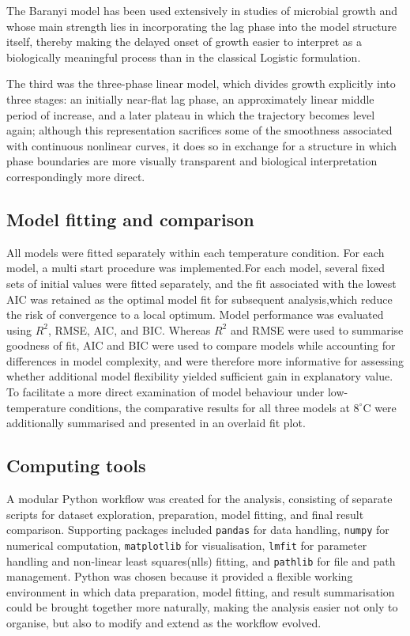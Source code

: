 \documentclass[11pt,onecolumn,draftclsnofoot]{IEEEtran}
\begin{document}
The Baranyi model has been used extensively in studies of microbial growth and whose main strength lies in incorporating the lag phase into the model structure itself, thereby making the delayed onset of growth easier to interpret as a biologically meaningful process than in the classical Logistic formulation\cite{BARANYI1994277}.

The third was the three-phase linear model, which divides growth explicitly into three stages: an initially near-flat lag phase, an approximately linear middle period of increase, and a later plateau in which the trajectory becomes level again; although this representation sacrifices some of the smoothness associated with continuous nonlinear curves, it does so in exchange for a structure in which phase boundaries are more visually transparent and biological interpretation correspondingly more direct\cite{BUCHANAN1997313}.

\subsection{Model fitting and comparison}
All models were fitted separately within each temperature condition. For each model, a multi start procedure was implemented.For each model, several fixed sets of initial values were fitted separately, and the fit associated with the lowest AIC was retained as the optimal model fit for subsequent analysis,which reduce the risk of convergence to a local optimum. Model performance was evaluated using $R^2$, RMSE, AIC, and BIC. Whereas $R^2$ and RMSE were used to summarise goodness of fit, AIC and BIC were used to compare models while accounting for differences in model complexity, and were therefore more informative for assessing whether additional model flexibility yielded sufficient gain in explanatory value. To facilitate a more direct examination of model behaviour under low-temperature conditions, the comparative results for all three models at $8^\circ$C were additionally summarised and presented in an overlaid fit plot.

\subsection{Computing tools}
A modular Python workflow was created for the analysis, consisting of separate scripts for dataset exploration,  preparation, model fitting, and final result comparison. Supporting packages included \texttt{pandas} for data handling, \texttt{numpy} for numerical computation, \texttt{matplotlib} for visualisation, \texttt{lmfit} for parameter handling and non-linear least squares(nlls) fitting, and \texttt{pathlib} for file and path management. Python was chosen because it provided a flexible working environment in which data preparation, model fitting, and result summarisation could be brought together more naturally, making the analysis easier not only to organise, but also to modify and extend as the workflow evolved.
\end{document}
